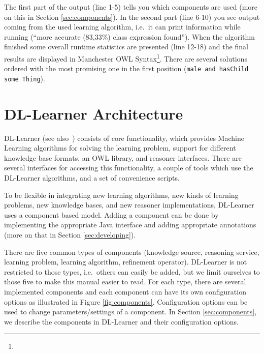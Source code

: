 \documentclass[a4paper,12pt]{scrartcl}
\begin{document}
The first part of the output (line 1-5) tells you which components are used (more on this in Section \ref{sec:components}). In the second part (line 6-10) you see output coming from the used learning algorithm, i.e.~it can print information while running (``more accurate (83,33\%) class expression found''). When the algorithm finished some overall runtime statistics are presented (line 12-18) and the final results are displayed in Manchester OWL Syntax\footnote{\mos}. There are several solutions ordered with the most promising one in the first position (\verb|male and hasChild some Thing|).

\section{DL-Learner Architecture}

DL-Learner (see also~\cite{dllearner_jmlr}) consists of core functionality, which provides Machine Learning algorithms for solving the learning problem, support for different knowledge base formats, an OWL library, and reasoner interfaces. There are several interfaces for accessing this functionality, a couple of tools which use the DL-Learner algorithms, and a set of convenience scripts.

To be flexible in integrating new learning algorithms, new kinds of learning problems, new knowledge bases, and new reasoner implementations, DL-Learner uses a component based model. Adding a component can be done by implementing the appropriate Java interface and adding appropriate annotations (more on that in Section \ref{sec:developing}).

There are five common types of components (knowledge source, reasoning service, learning problem, learning algorithm, refinement operator). DL-Learner is not restricted to those types, i.e.~others can easily be added, but we limit ourselves to those five to make this manual easier to read. For each type, there are several implemented components and each component can have its own configuration options as illustrated in Figure \ref{fig:components}. Configuration options can be used to change parameters/settings of a component. In Section \ref{sec:components}, we describe the components in DL-Learner and their configuration options.
\end{document}
